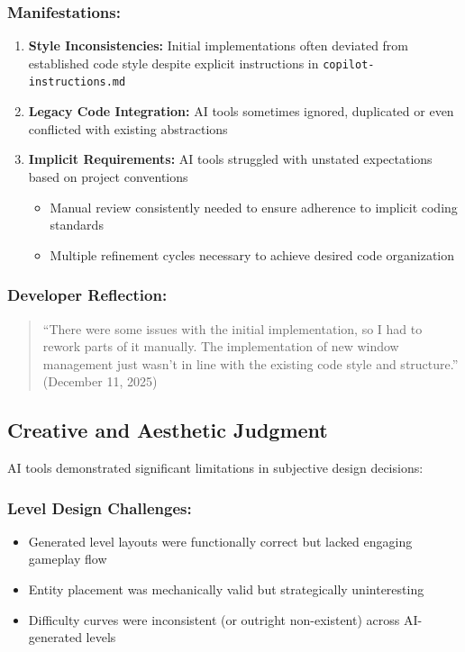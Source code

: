 \documentclass[12pt,a4paper]{article}
\begin{document}
\subsubsection*{Manifestations:}
\begin{enumerate}
    \item \textbf{Style Inconsistencies:} Initial implementations often deviated from established code style despite explicit instructions in \texttt{copilot-instructions.md}

    \item \textbf{Legacy Code Integration:} AI tools sometimes ignored, duplicated or even conflicted with existing abstractions
    
    \item \textbf{Implicit Requirements:} AI tools struggled with unstated expectations based on project conventions
    \begin{itemize}
        \item Manual review consistently needed to ensure adherence to implicit coding standards
        \item Multiple refinement cycles necessary to achieve desired code organization
    \end{itemize}
\end{enumerate}

\subsubsection*{Developer Reflection:}
\begin{quote}
``There were some issues with the initial implementation, so I had to rework parts of it manually. The implementation of new window management just wasn't in line with the existing code style and structure.'' (December 11, 2025)
\end{quote}

\subsection{Creative and Aesthetic Judgment}

AI tools demonstrated significant limitations in subjective design decisions:

\subsubsection*{Level Design Challenges:}
\begin{itemize}
    \item Generated level layouts were functionally correct but lacked engaging gameplay flow
    \item Entity placement was mechanically valid but strategically uninteresting
    \item Difficulty curves were inconsistent (or outright non-existent) across AI-generated levels
\end{itemize}
\end{document}
